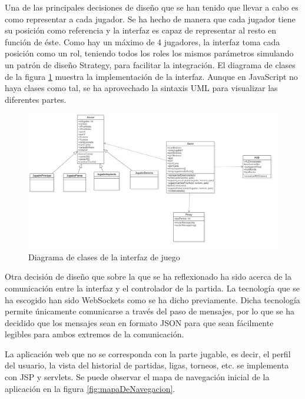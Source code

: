Una de las principales decisiones de diseño que se han tenido que llevar a cabo es como representar a cada jugador. Se ha hecho de manera que cada jugador tiene su posición como referencia y la interfaz es capaz de representar al resto en función de éste. Como hay un máximo de 4 jugadores, la interfaz toma cada posición como un rol,  teniendo todos los roles los mismos parámetros simulando un patrón de diseño Strategy, para facilitar la integración. El diagrama de clases de la figura \ref{fig:clasesInterfazJuego} muestra la implementación de la interfaz. Aunque en JavaScript no haya clases como tal, se ha aprovechado la sintaxis UML para visualizar las diferentes partes.

\begin{figure}
  \includegraphics[width=\linewidth]{figuras/clasesInterfazJuego.png}
  \caption{Diagrama de clases de la interfaz de juego}
  \label{fig:clasesInterfazJuego}
\end{figure}

Otra decisión de diseño que sobre la que se ha reflexionado ha sido acerca de la comunicación entre la interfaz y el controlador de la partida. La tecnología que se ha escogido han sido WebSockets como se ha dicho previamente. Dicha tecnología permite únicamente comunicarse a través del paso de mensajes, por lo que se ha decidido que los mensajes sean en formato JSON para que sean fácilmente legibles para ambos extremos de la comunicación.

La aplicación web que no se corresponda con la parte jugable, es decir, el perfil del usuario, la vista del historial de partidas, ligas, torneos, etc. se implementa con JSP y servlets. Se puede observar el mapa de navegación inicial de la aplicación en la figura \ref{fig:mapaDeNavegacion}.

